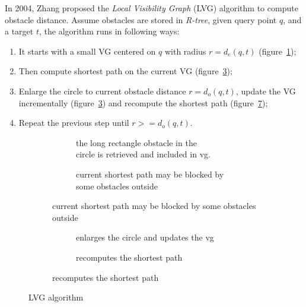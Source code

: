 In 2004, Zhang proposed the \textit{Local Visibility Graph} (LVG) algorithm\cite{zhang2004spatial}
to compute obstacle distance.
Assume obstacles are stored in \textit{R-tree},
given query point $q$, and a target $t$, the algorithm runs in
following ways:
\begin{enumerate}
    \item It starts with a small VG centered on $q$ with radius $r=d_e(q, t)$ (figure~\ref{edbt1});
    \item Then compute shortest path on the current VG (figure~\ref{edbt2});
    \item Enlarge the circle to current obstacle distance $r=d_o(q,t)$, update the VG
      incrementally (figure~\ref{edbt2}) and recompute the shortest path (figure~\ref{edbt4});
    \item Repeat the previous step until $r>=d_o(q, t)$.
\end{enumerate}

\begin{figure}[!h]
  \begin{subfigure}{\linewidth}
    \centering
    \begin{subfigure}{.45\linewidth}
      \centering
      
      \caption{
        \small 
        the long rectangle obstacle in the\\
        circle is retrieved and included in vg.
      }
      \label{edbt1}
    \end{subfigure}%
    \begin{subfigure}{.45\linewidth}
      \centering
      
      \caption{
        \small current shortest path may be blocked by some obstacles outside
      }
      \label{edbt2}
    \end{subfigure}
  \end{subfigure}\par\medskip
  \begin{subfigure}{\linewidth}
    \centering
    \begin{subfigure}{.45\linewidth}
      \centering
      
      \caption{
        \small enlarges the circle and updates the vg
      }
      \label{edbt3}
    \end{subfigure}%
    \begin{subfigure}{.45\linewidth}
      \centering
      
      \caption{
        \small recomputes the shortest path  
      }
      \label{edbt4}
    \end{subfigure}
  \end{subfigure}
  \caption{\small LVG algorithm}
\end{figure}

